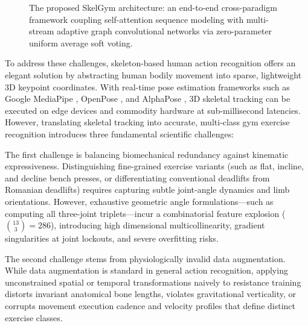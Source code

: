 \documentclass[preprint,12pt]{elsarticle}
\begin{document}
\begin{figure}[!t]
{
}
\caption{The proposed SkelGym architecture: an end-to-end cross-paradigm framework coupling self-attention sequence modeling with multi-stream adaptive graph convolutional networks via zero-parameter uniform average soft voting.}
\label{fig:pipeline_full}
\end{figure}

To address these challenges, skeleton-based human action recognition offers an elegant solution by abstracting human bodily movement into sparse, lightweight 3D keypoint coordinates. 
With real-time pose estimation frameworks such as Google MediaPipe \cite{chuankun2019,bazarevsky2020}, OpenPose \cite{cao2019}, and AlphaPose \cite{fang2022}, 3D skeletal tracking can be executed on edge devices and commodity hardware at sub-millisecond latencies. 
However, translating skeletal tracking into accurate, multi-class gym exercise recognition introduces three fundamental scientific challenges:

The first challenge is balancing biomechanical redundancy against kinematic expressiveness. Distinguishing fine-grained exercise variants (such as flat, incline, and decline bench presses, or differentiating conventional deadlifts from Romanian deadlifts) requires capturing subtle joint-angle dynamics and limb orientations. However, exhaustive geometric angle formulations---such as computing all three-joint triplets---incur a combinatorial feature explosion ($\binom{13}{3} = 286$), introducing high dimensional multicollinearity, gradient singularities at joint lockouts, and severe overfitting risks.

The second challenge stems from physiologically invalid data augmentation. While data augmentation is standard in general action recognition, applying unconstrained spatial or temporal transformations naively to resistance training distorts invariant anatomical bone lengths, violates gravitational verticality, or corrupts movement execution cadence and velocity profiles that define distinct exercise classes.
\end{document}

